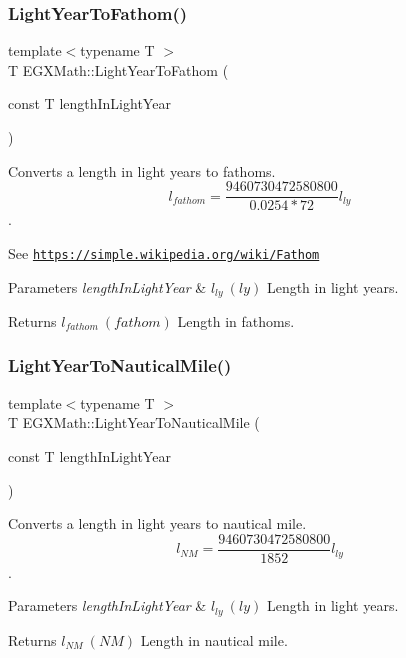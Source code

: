 \subsubsection{\texorpdfstring{Light\+Year\+To\+Fathom()}{LightYearToFathom()}}
{\footnotesize\ttfamily template$<$typename T $>$ \\
T E\+G\+X\+Math\+::\+Light\+Year\+To\+Fathom (\begin{DoxyParamCaption}\item[{const T}]{length\+In\+Light\+Year }\end{DoxyParamCaption})}



Converts a length in light years to fathoms. \[ l_{fathom}= \frac{9460730472580800}{0.0254 * 72} l_{ly} \]. 

See \href{https://simple.wikipedia.org/wiki/Fathom}{\tt https\+://simple.\+wikipedia.\+org/wiki/\+Fathom} 
\begin{DoxyParams}{Parameters}
{\em length\+In\+Light\+Year} & $ l_{ly}\ (ly)$ Length in light years. \\
\hline
\end{DoxyParams}
\begin{DoxyReturn}{Returns}
$ l_{fathom}\ (fathom)$ Length in fathoms. 
\end{DoxyReturn}
\mbox{\label{group___e_g_x_math-_conversions-_length_conversions-_astronomical-_light_year-_nautical_ga0195b6c7d9efe06bed6d571046d485b4}} 
\subsubsection{\texorpdfstring{Light\+Year\+To\+Nautical\+Mile()}{LightYearToNauticalMile()}}
{\footnotesize\ttfamily template$<$typename T $>$ \\
T E\+G\+X\+Math\+::\+Light\+Year\+To\+Nautical\+Mile (\begin{DoxyParamCaption}\item[{const T}]{length\+In\+Light\+Year }\end{DoxyParamCaption})}



Converts a length in light years to nautical mile. \[ l_{NM}= \frac{9460730472580800}{1852} l_{ly} \]. 


\begin{DoxyParams}{Parameters}
{\em length\+In\+Light\+Year} & $ l_{ly}\ (ly)$ Length in light years. \\
\hline
\end{DoxyParams}
\begin{DoxyReturn}{Returns}
$ l_{NM}\ (NM)$ Length in nautical mile. 
\end{DoxyReturn}
